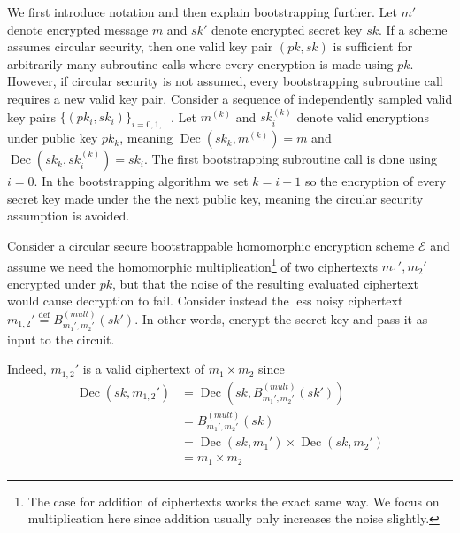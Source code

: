 We first introduce notation and then explain bootstrapping further. Let $m'$ denote encrypted message $m$ and $sk'$ denote encrypted secret key $sk$. If a scheme assumes circular security, then one valid key pair $(pk,sk)$ is sufficient for arbitrarily many subroutine calls where every encryption is made using $pk$. However, if circular security is not assumed, every bootstrapping subroutine call requires a new valid key pair. Consider a sequence of independently sampled valid key pairs $\{(pk_i,sk_i)\}_{i = 0, 1, \dots}$. Let $m^{(k)}$ and $sk_i^{(k)}$ denote valid encryptions under public key $pk_k$, meaning $\operatorname{Dec}(sk_k,m^{(k)}) = m$ and $\operatorname{Dec}(sk_k,sk_i^{(k)}) = sk_i$. The first bootstrapping subroutine call is done using $i = 0$. In the bootstrapping algorithm we set $k = i+1$ so the encryption of every secret key made under the the next public key, meaning the circular security assumption is avoided. 


Consider a circular secure bootstrappable homomorphic encryption scheme $\mathcal{E}$ and assume we need the homomorphic multiplication\footnote{The case for addition of ciphertexts works the exact same way. We focus on multiplication here since addition usually only increases the noise slightly.} of two ciphertexts $m_1', m_2'$ encrypted under $pk$, but that the noise of the resulting evaluated ciphertext would cause decryption to fail. Consider instead the less noisy ciphertext $m_{1,2}' \stackrel{\mathrm{def}}{=} B_{m_1',m_2'}^{(mult)}(sk')$. In other words, encrypt the secret key and pass it as input to the circuit.


Indeed, $m_{1,2}'$ is a valid ciphertext of $m_1 \times m_2$ since 
\begin{equation*}
    \begin{aligned}
        \operatorname{Dec}(sk, m_{1,2}') &= \operatorname{Dec}(sk, B_{m_1',m_2'}^{(mult)}(sk'))\\
        &= B_{m_1',m_2'}^{(mult)}(sk) \\
        &= \operatorname{Dec}(sk, m_1') \times \operatorname{Dec}(sk, m_2')\\
        &= m_1 \times m_2
    \end{aligned}
\end{equation*}

